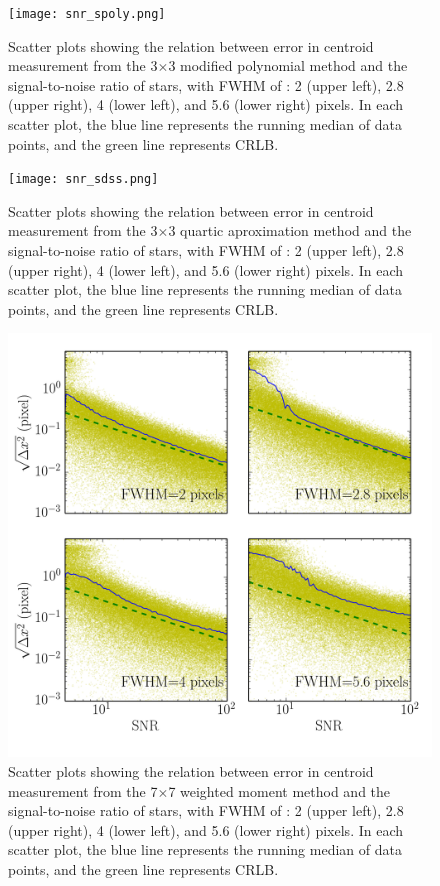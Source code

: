\documentclass[12pt, preprint]{aastex}
\begin{document}
\begin{figure}[!htb]
  \texttt{[image: snr\_spoly.png]}
\endminipage
\caption{Scatter plots showing the relation between error in centroid measurement from the 3$\times$3 modified polynomial method and the signal-to-noise ratio of stars, with FWHM of : 2 (upper left), 2.8 (upper right), 4 (lower left), and 5.6 (lower right) pixels. In each scatter plot, the blue line represents the running median of data points, and the green line represents CRLB.}\label{2}
\end{figure}

\begin{figure}[!htb]
  \texttt{[image: snr\_sdss.png]}
\endminipage
\caption{Scatter plots showing the relation between error in centroid measurement from the 3$\times$3 quartic aproximation method and the signal-to-noise ratio of stars, with FWHM of : 2 (upper left), 2.8 (upper right), 4 (lower left), and 5.6 (lower right) pixels. In each scatter plot, the blue line represents the running median of data points, and the green line represents CRLB.}\label{3}
\end{figure}

\begin{figure}[!htb]
  \includegraphics[width=\linewidth]{snr_moment.png}
\endminipage
\caption{Scatter plots showing the relation between error in centroid measurement
from the 7$\times$7 weighted moment method and the signal-to-noise ratio of stars,
with FWHM of : 2 (upper left), 2.8 (upper right), 4 (lower left), and 5.6 (lower right)
pixels. In each scatter plot, the blue line represents the running median of data points,
and the green line represents CRLB.}\label{4}
\end{figure}
\end{document}
